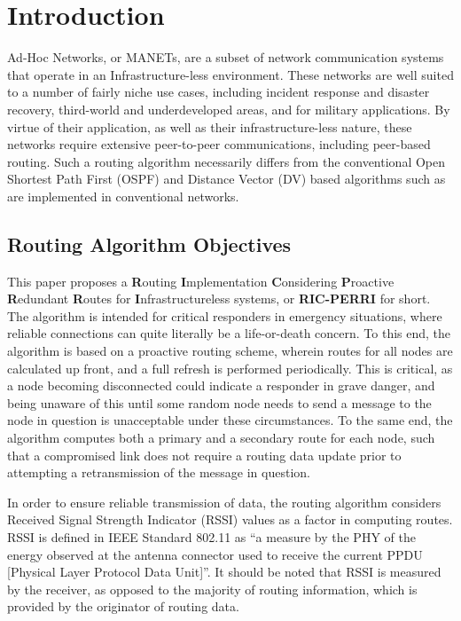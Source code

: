 \section{Introduction}\label{sec:introduction}
 Ad-Hoc Networks, or MANETs, are a subset of network communication systems that operate in an Infrastructure-less environment. These networks are well suited to a number of fairly niche use cases, including incident response and disaster recovery, third-world and underdeveloped areas, and for military applications. By virtue of their application, as well as their infrastructure-less nature, these networks require extensive peer-to-peer communications, including peer-based routing. Such a routing algorithm necessarily differs from the conventional Open Shortest Path First (OSPF) and Distance Vector (DV) based algorithms such as are implemented in conventional networks.

\subsection{Routing Algorithm Objectives}\label{subsec:objectives}

This paper proposes a \textbf{R}outing \textbf{I}mplementation \textbf{C}onsidering \textbf{P}roactive \textbf{R}edundant \textbf{R}outes for \textbf{I}nfrastructureless systems, or \textbf{RIC-PERRI} \cite{perry_rp_2022} for short. The algorithm is intended for critical responders in emergency situations, where reliable connections can quite literally be a life-or-death concern. To this end, the algorithm is based on a proactive routing scheme, wherein routes for all nodes are calculated up front, and a full refresh is performed periodically. This is critical, as a node becoming disconnected could indicate a responder in grave danger, and being unaware of this until some random node needs to send a message to the node in question is unacceptable under these circumstances. To the same end, the algorithm computes both a primary and a secondary route for each node, such that a compromised link does not require a routing data update prior to attempting a retransmission of the message in question. 

In order to ensure reliable transmission of data, the routing algorithm considers Received Signal Strength Indicator (RSSI) values as a factor in computing routes. RSSI is defined in IEEE Standard 802.11 as ``a measure by the PHY of the energy observed at the antenna connector used to receive the current PPDU [Physical Layer Protocol Data Unit]''\cite{lanman_standards_committee_80211-2020_2021}. It should be noted that RSSI is measured by the receiver, as opposed to the majority of routing information, which is provided by the originator of routing data.

